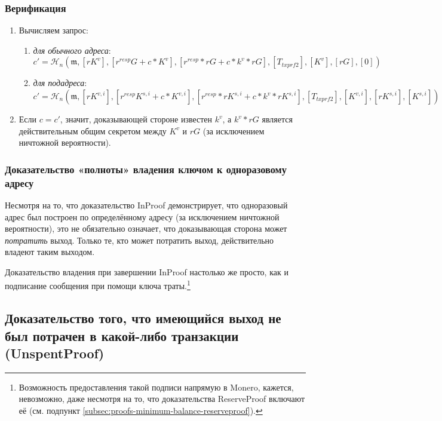 \subsubsection*{Верификация}

\begin{enumerate}
    \item Вычисляем запрос:
    \begin{enumerate}
        \item {\em для обычного адреса}:\vspace{.145cm}
	    \[c' = \mathcal{H}_n(\mathfrak{m},[rK^v], [r^{resp} G + c*K^v], [r^{resp}*r G + c*k^v*r G], [T_{txprf2}], [K^v], [rG], [0])\]
	    \item {\em для подадреса}:\vspace{.16cm}
	    \[c' = \mathcal{H}_n(\mathfrak{m},[rK^{v,i}], [r^{resp} K^{s,i} + c*K^{v,i}], [r^{resp}*r K^{s,i} + c*k^v*r K^{s,i}], [T_{txprf2}], [K^{v,i}], [r K^{s,i}], [K^{s,i}])\]
    \end{enumerate}{}
    \item Если $c = c'$, значит, доказывающей стороне известен $k^v$, а $k^v*r G$ является действитель\-ным общим секретом между $K^v$ и $r G$ (за исключением ничтожной вероятности).
\end{enumerate}{}

\subsubsection*{Доказательство «полноты» владения ключом к одноразовому адресу}

Несмотря на то, что доказательство InProof демонстрирует, что одноразовый адрес был построен по определённому адресу (за исключением ничтожной вероятности), это не обяза\-тельно означает, что доказывающая сторона может {\em потратить} выход. Только те, кто может потратить выход, действительно владеют таким выходом.

Доказательство владения при завершении InProof настолько же просто, как и подписание сообщения при помощи ключа траты.\footnote{Возможность предоставления такой подписи напрямую в Monero, кажется, невозможно, даже несмотря на то, что доказательства ReserveProof включают её (см. подпункт \ref{subsec:proofs-minimum-balance-reserveproof}).}


\subsection{Доказательство того, что имеющийся выход не был потрачен в какой-либо транзакции (UnspentProof)}
\label{subsec:proofs-owned-output-spent-unspentproof}

